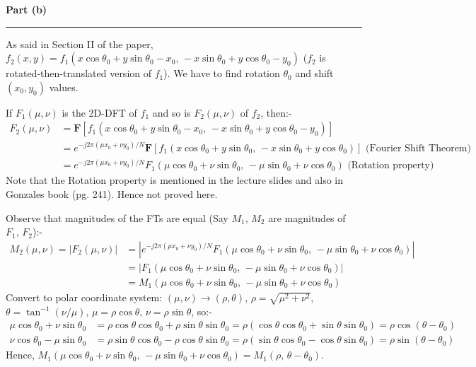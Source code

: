 \documentclass[a4paper,12pt]{article}
\newenvironment{solution}[2][]{%
\begin{mdframed}[linecolor=blue!70!black, linewidth=2pt, roundcorner=10pt, backgroundcolor=yellow!10!white, skipabove=12pt, skipbelow=12pt]%
	\textbf{\large #2}
	\par\noindent\rule{\textwidth}{0.4pt}
}{
\end{mdframed}
}
\begin{document}
\begin{solution}{Part (b)}
	As said in Section II of the paper, $f_2(x, y) = f_1(x \cos \theta_0 + y \sin \theta_0 - x_0, \, - x \sin \theta_0 + y \cos \theta_0 - y_0)$ ($f_2$ is rotated-then-translated version of $f_1$). We have to find rotation $\theta_0$ and shift $(x_0, y_0)$ values.
	
	If $F_1(\mu, \nu)$ is the 2D-DFT of $f_1$ and so is $F_2(\mu, \nu)$ of $f_2$, then:-
	\begin{align*}
		F_2(\mu, \nu) &= \mathbf{F} [f_1(x \cos \theta_0 + y \sin \theta_0 - x_0, \, - x \sin \theta_0 + y \cos \theta_0 - y_0)] \\
		&= e^{-j2\pi (\mu x_0 + \nu y_0)/N} \mathbf{F} [f_1(x \cos \theta_0 + y \sin \theta_0, \, - x \sin \theta_0 + y \cos \theta_0)] \text{ (Fourier Shift Theorem)}\\
		&= e^{-j2\pi (\mu x_0 + \nu y_0)/N} F_1(\mu \cos \theta_0 + \nu \sin \theta_0, \, - \mu \sin \theta_0 + \nu \cos \theta_0) \text{ (Rotation property)}
	\end{align*}
	Note that the Rotation property is mentioned in the lecture slides and also in Gonzales book (pg. 241). Hence not proved here.

	Observe that magnitudes of the FTs are equal (Say $M_1, \, M_2$ are magnitudes of $F_1, \, F_2$):-
	\begin{align*}
		M_2(\mu, \nu) = |F_2(\mu, \nu)| &= |e^{-j2\pi (\mu x_0 + \nu y_0)/N} F_1(\mu \cos \theta_0 + \nu \sin \theta_0, \, - \mu \sin \theta_0 + \nu \cos \theta_0)| \\
		&= |F_1(\mu \cos \theta_0 + \nu \sin \theta_0, \, - \mu \sin \theta_0 + \nu \cos \theta_0)| \\
		&= M_1(\mu \cos \theta_0 + \nu \sin \theta_0, \, - \mu \sin \theta_0 + \nu \cos \theta_0)
	\end{align*}
	Convert to polar coordinate system: $(\mu, \nu) \rightarrow (\rho, \theta)$, $\rho = \sqrt{\mu^2 + \nu^2}$, $\theta = \tan^{-1}(\nu/\mu)$, $\mu = \rho \cos \theta, \, \nu = \rho \sin \theta$, so:-
	\begin{align*}
		\mu \cos \theta_0 + \nu \sin \theta_0 &= \rho \cos \theta \cos \theta_0 + \rho \sin \theta \sin \theta_0 = \rho (\cos \theta \cos \theta_0 + \sin \theta \sin \theta_0) = \rho \cos (\theta - \theta_0) \\
		\nu \cos \theta_0 - \mu \sin \theta_0 &= \rho \sin \theta \cos \theta_0 - \rho \cos \theta \sin \theta_0 = \rho (\sin \theta \cos \theta_0 - \cos \theta \sin \theta_0) = \rho \sin (\theta - \theta_0)
	\end{align*}
	Hence, $M_1(\mu \cos \theta_0 + \nu \sin \theta_0, \, - \mu \sin \theta_0 + \nu \cos \theta_0) = M_1(\rho, \, \theta - \theta_0)$.
	

\end{solution}
\end{document}
